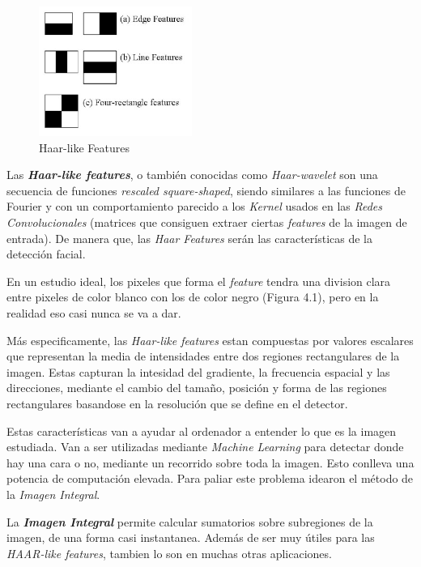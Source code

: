 \begin{figure}[htp]
	\centering
	\includegraphics[width=5cm]{imagenes/haar-like.jpeg}
	\caption{Haar-like Features}
	\label{fig:haarLike}
\end{figure}

Las \textbf{\textit{Haar-like features}}, o también conocidas como \textit{Haar-wavelet} son una secuencia de funciones \textit{rescaled square-shaped}, siendo similares a las funciones de Fourier y con un comportamiento parecido a los \textit{Kernel} usados en las \textit{Redes Convolucionales} (matrices que consiguen extraer ciertas \textit{features} de la imagen de entrada). De manera que, las \textit{Haar Features} serán las características de la detección facial.

En un estudio ideal, los pixeles que forma el \textit{feature} tendra una division clara entre pixeles de color blanco con los de color negro (Figura 4.1), pero en la realidad eso casi nunca se va a dar.

Más especificamente, las \textit{Haar-like features} estan compuestas por valores escalares que representan la media de intensidades entre dos regiones rectangulares de la imagen. Estas capturan la intesidad del gradiente, la frecuencia espacial y las direcciones, mediante el cambio del tamaño, posición y forma de las regiones rectangulares basandose en la resolución que se define en el detector. \cite{haar-like}

Estas características van a ayudar al ordenador a entender lo que es la imagen estudiada. Van a ser utilizadas mediante \textit{Machine Learning} para detectar donde hay una cara o no, mediante un recorrido sobre toda la imagen. Esto conlleva una potencia de computación elevada. Para paliar este problema idearon el método de la \textit{Imagen Integral}.

La \textbf{\textit{Imagen Integral}} permite calcular sumatorios sobre subregiones de la imagen, de una forma casi instantanea. Además de ser muy útiles para las \textit{HAAR-like features}, tambien lo son en muchas otras aplicaciones.

